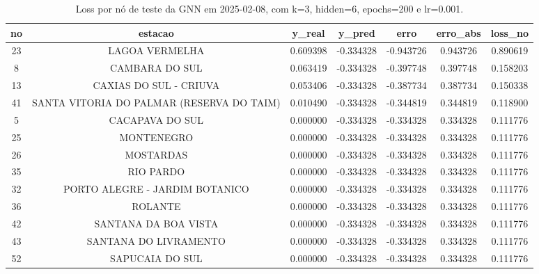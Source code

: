 \begin{table}[h]
\centering
\caption{Loss por nó de teste da GNN em 2025-02-08, com k=3, hidden=6, epochs=200 e lr=0.001.}
\label{tab:gnn_loss_nodes_k3_hidden6}
\begin{tabular}{ccccccc}
\toprule
no & estacao & y\_real & y\_pred & erro & erro\_abs & loss\_no \\
\midrule
23 & LAGOA VERMELHA & 0.609398 & -0.334328 & -0.943726 & 0.943726 & 0.890619 \\
8 & CAMBARA DO SUL & 0.063419 & -0.334328 & -0.397748 & 0.397748 & 0.158203 \\
13 & CAXIAS DO SUL - CRIUVA & 0.053406 & -0.334328 & -0.387734 & 0.387734 & 0.150338 \\
41 & SANTA VITORIA DO PALMAR (RESERVA DO TAIM) & 0.010490 & -0.334328 & -0.344819 & 0.344819 & 0.118900 \\
5 & CACAPAVA DO SUL & 0.000000 & -0.334328 & -0.334328 & 0.334328 & 0.111776 \\
25 & MONTENEGRO & 0.000000 & -0.334328 & -0.334328 & 0.334328 & 0.111776 \\
26 & MOSTARDAS & 0.000000 & -0.334328 & -0.334328 & 0.334328 & 0.111776 \\
35 & RIO PARDO & 0.000000 & -0.334328 & -0.334328 & 0.334328 & 0.111776 \\
32 & PORTO ALEGRE - JARDIM BOTANICO & 0.000000 & -0.334328 & -0.334328 & 0.334328 & 0.111776 \\
36 & ROLANTE & 0.000000 & -0.334328 & -0.334328 & 0.334328 & 0.111776 \\
42 & SANTANA DA BOA VISTA & 0.000000 & -0.334328 & -0.334328 & 0.334328 & 0.111776 \\
43 & SANTANA DO LIVRAMENTO & 0.000000 & -0.334328 & -0.334328 & 0.334328 & 0.111776 \\
52 & SAPUCAIA DO SUL & 0.000000 & -0.334328 & -0.334328 & 0.334328 & 0.111776 \\
\bottomrule
\end{tabular}
\end{table}
